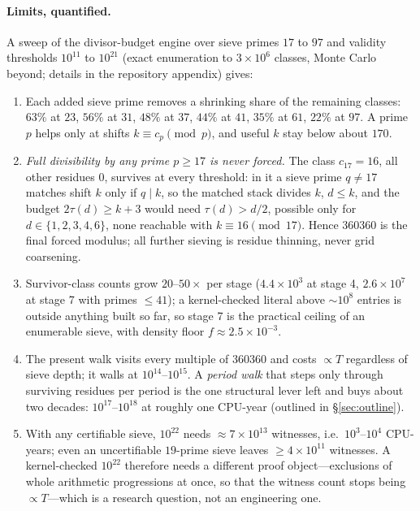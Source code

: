 \documentclass[11pt]{article}
\begin{document}
\paragraph{Limits, quantified.} A sweep of the divisor-budget engine over sieve primes $17$ to $97$ and validity thresholds $10^{11}$ to $10^{21}$ (exact enumeration to $3\times10^{6}$ classes, Monte Carlo beyond; details in the repository appendix) gives:
\begin{enumerate}
\item Each added sieve prime removes a shrinking share of the remaining classes: $63\%$ at $23$, $56\%$ at $31$, $48\%$ at $37$, $44\%$ at $41$, $35\%$ at $61$, $22\%$ at $97$. A prime $p$ helps only at shifts $k\equiv c_p\pmod p$, and useful $k$ stay below about $170$.
\item \emph{Full divisibility by any prime $p\ge17$ is never forced.} The class $c_{17}=16$, all other residues $0$, survives at every threshold: in it a sieve prime $q\ne17$ matches shift $k$ only if $q\mid k$, so the matched stack divides $k$, $d\le k$, and the budget $2\tau(d)\ge k+3$ would need $\tau(d)>d/2$, possible only for $d\in\{1,2,3,4,6\}$, none reachable with $k\equiv16\pmod{17}$. Hence $360360$ is the final forced modulus; all further sieving is residue thinning, never grid coarsening.
\item Survivor-class counts grow $20$--$50\times$ per stage ($4.4\times10^{3}$ at stage 4, $2.6\times10^{7}$ at stage 7 with primes $\le41$); a kernel-checked literal above $\sim10^{8}$ entries is outside anything built so far, so stage 7 is the practical ceiling of an enumerable sieve, with density floor $f\approx2.5\times10^{-3}$.
\item The present walk visits every multiple of $360360$ and costs $\propto T$ regardless of sieve depth; it walls at $10^{14}$--$10^{15}$. A \emph{period walk} that steps only through surviving residues per period is the one structural lever left and buys about two decades: $10^{17}$--$10^{18}$ at roughly one CPU-year (outlined in \S\ref{sec:outline}).
\item With any certifiable sieve, $10^{22}$ needs $\approx7\times10^{13}$ witnesses, i.e.\ $10^{3}$--$10^{4}$ CPU-years; even an uncertifiable $19$-prime sieve leaves $\ge4\times10^{11}$ witnesses. A kernel-checked $10^{22}$ therefore needs a different proof object---exclusions of whole arithmetic progressions at once, so that the witness count stops being $\propto T$---which is a research question, not an engineering one.
\end{enumerate}
\end{document}

